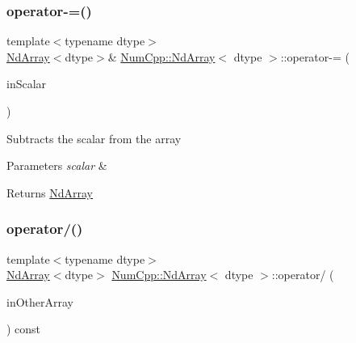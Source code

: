 \subsubsection{\texorpdfstring{operator-\/=()}{operator-=()}\hspace{0.1cm}{\footnotesize\ttfamily [2/2]}}
{\footnotesize\ttfamily template$<$typename dtype$>$ \\
\mbox{\hyperlink{class_num_cpp_1_1_nd_array}{Nd\+Array}}$<$dtype$>$\& \mbox{\hyperlink{class_num_cpp_1_1_nd_array}{Num\+Cpp\+::\+Nd\+Array}}$<$ dtype $>$\+::operator-\/= (\begin{DoxyParamCaption}\item[{dtype}]{in\+Scalar }\end{DoxyParamCaption})\hspace{0.3cm}{\ttfamily [inline]}}

Subtracts the scalar from the array


\begin{DoxyParams}{Parameters}
{\em scalar} & \\
\hline
\end{DoxyParams}
\begin{DoxyReturn}{Returns}
\mbox{\hyperlink{class_num_cpp_1_1_nd_array}{Nd\+Array}} 
\end{DoxyReturn}
\mbox{\label{class_num_cpp_1_1_nd_array_a7a33ca0868d55faf89c20afd3b1db026}} 
\subsubsection{\texorpdfstring{operator/()}{operator/()}\hspace{0.1cm}{\footnotesize\ttfamily [1/2]}}
{\footnotesize\ttfamily template$<$typename dtype$>$ \\
\mbox{\hyperlink{class_num_cpp_1_1_nd_array}{Nd\+Array}}$<$dtype$>$ \mbox{\hyperlink{class_num_cpp_1_1_nd_array}{Num\+Cpp\+::\+Nd\+Array}}$<$ dtype $>$\+::operator/ (\begin{DoxyParamCaption}\item[{const \mbox{\hyperlink{class_num_cpp_1_1_nd_array}{Nd\+Array}}$<$ dtype $>$ \&}]{in\+Other\+Array }\end{DoxyParamCaption}) const\hspace{0.3cm}{\ttfamily [inline]}}

